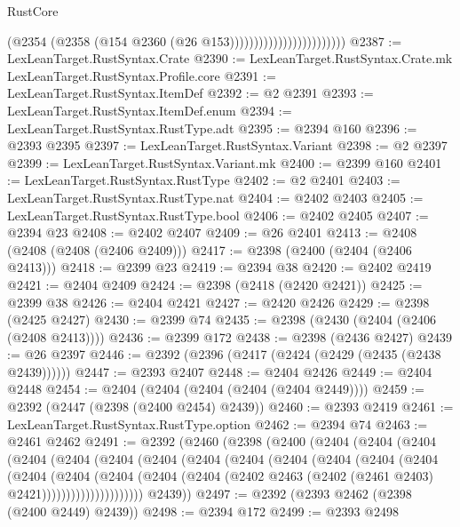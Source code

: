 \begin{lexlean}{RustCore}
\begin{coremodule}
                                            (@2354
                                              (@2358 (@154 @2360 (@26 @153))))))))))))))))))))))))
@2387 := LexLeanTarget.RustSyntax.Crate
@2390 := LexLeanTarget.RustSyntax.Crate.mk LexLeanTarget.RustSyntax.Profile.core
@2391 := LexLeanTarget.RustSyntax.ItemDef
@2392 := @2 @2391
@2393 := LexLeanTarget.RustSyntax.ItemDef.enum
@2394 := LexLeanTarget.RustSyntax.RustType.adt
@2395 := @2394 @160
@2396 := @2393 @2395
@2397 := LexLeanTarget.RustSyntax.Variant
@2398 := @2 @2397
@2399 := LexLeanTarget.RustSyntax.Variant.mk
@2400 := @2399 @160
@2401 := LexLeanTarget.RustSyntax.RustType
@2402 := @2 @2401
@2403 := LexLeanTarget.RustSyntax.RustType.nat
@2404 := @2402 @2403
@2405 := LexLeanTarget.RustSyntax.RustType.bool
@2406 := @2402 @2405
@2407 := @2394 @23
@2408 := @2402 @2407
@2409 := @26 @2401
@2413 := @2408 (@2408 (@2408 (@2406 @2409)))
@2417 := @2398 (@2400 (@2404 (@2406 @2413)))
@2418 := @2399 @23
@2419 := @2394 @38
@2420 := @2402 @2419
@2421 := @2404 @2409
@2424 := @2398 (@2418 (@2420 @2421))
@2425 := @2399 @38
@2426 := @2404 @2421
@2427 := @2420 @2426
@2429 := @2398 (@2425 @2427)
@2430 := @2399 @74
@2435 := @2398 (@2430 (@2404 (@2406 (@2408 @2413))))
@2436 := @2399 @172
@2438 := @2398 (@2436 @2427)
@2439 := @26 @2397
@2446 := @2392 (@2396 (@2417 (@2424 (@2429 (@2435 (@2438 @2439))))))
@2447 := @2393 @2407
@2448 := @2404 @2426
@2449 := @2404 @2448
@2454 := @2404 (@2404 (@2404 (@2404 (@2404 @2449))))
@2459 := @2392 (@2447 (@2398 (@2400 @2454) @2439))
@2460 := @2393 @2419
@2461 := LexLeanTarget.RustSyntax.RustType.option
@2462 := @2394 @74
@2463 := @2461 @2462
@2491 := @2392
    (@2460
      (@2398
        (@2400
          (@2404
            (@2404
              (@2404
                (@2404
                  (@2404
                    (@2404
                      (@2404
                        (@2404
                          (@2404
                            (@2404
                              (@2404
                                (@2404
                                  (@2404
                                    (@2404
                                      (@2404
                                        (@2404
                                          (@2404
                                            (@2404
                                              (@2402
                                                @2463
                                                (@2402 (@2461 @2403) @2421)))))))))))))))))))))
        @2439))
@2497 := @2392 (@2393 @2462 (@2398 (@2400 @2449) @2439))
@2498 := @2394 @172
@2499 := @2393 @2498

\end{coremodule}
\end{lexlean}
